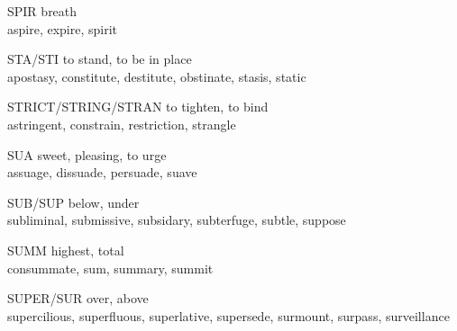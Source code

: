 \begin{flashcard}[Roots]{SPIR}
breath\\
\vspace{0.2in}
aspire, expire, spirit\\
\end{flashcard}

\begin{flashcard}[Roots]{STA/STI}
to stand, to be in place\\
\vspace{0.2in}
apostasy, constitute, destitute, obstinate, stasis, static\\
\end{flashcard}

\begin{flashcard}[Roots]{STRICT/STRING/STRAN}
to tighten, to bind\\
\vspace{0.2in}
astringent, constrain, restriction, strangle\\
\end{flashcard}

\begin{flashcard}[Roots]{SUA}
sweet, pleasing, to urge\\
\vspace{0.2in}
assuage, dissuade, persuade, suave\\
\end{flashcard}

\begin{flashcard}[Roots]{SUB/SUP}
below, under\\
\vspace{0.2in}
subliminal, submissive, subsidary, subterfuge, subtle, suppose\\
\end{flashcard}

\begin{flashcard}[Roots]{SUMM}
highest, total\\
\vspace{0.2in}
consummate, sum, summary, summit\\
\end{flashcard}

\begin{flashcard}[Roots]{SUPER/SUR}
over, above\\
\vspace{0.2in}
supercilious, superfluous, superlative, supersede, surmount, surpass, surveillance\\
\end{flashcard}

